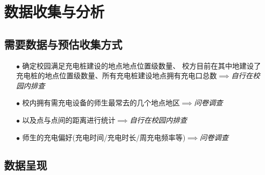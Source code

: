 \section{数据收集与分析}
\subsection{需要数据与预估收集方式}
\begin{itemize}
    \item [\textbf{$\bullet $}] 确定校园满足充电桩建设的地点地点位置级数量、 校方目前在其中地建设了充电桩的地点位置级数量、所有充电桩建设地点拥有充电口总数$\implies $\textit{自行在校园内排查}
    \item [\textbf{$\bullet $}] 校内拥有需充电设备的师生最常去的几个地点地区$\implies $\textit{问卷调查}
    \item  [\textbf{$\bullet $}]以及点与点间的距离进行统计$\implies $\textit{自行在校园内排查}
    \item [\textbf{$\bullet $}]师生的充电偏好(充电时间/充电时长/周充电频率等)$\implies $\textit{问卷调查}
\end{itemize}
\subsection{数据呈现}
\begin{figure}[H]
	\centering
	
	\label{functionrelationship}
\end{figure}

